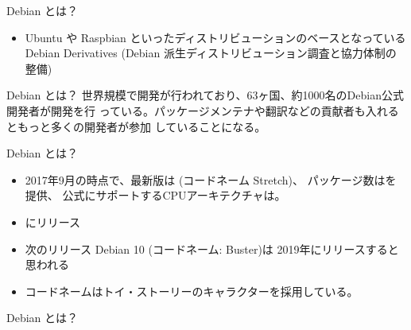 \begin{frame}{Debian とは？}

\begin{minipage}{0.45\hsize}
  \begin{itemize}
  \item Ubuntu や Raspbian といったディストリビューションのベースとなっている \\
	Debian Derivatives (Debian 派生ディストリビューション調査と協力体制の整備)
  \end{itemize}
\end{minipage} 
\begin{minipage}{0.45\hsize}
 \begin{center} 
 \end{center}
\end{minipage}

\end{frame}


\begin{frame}{Debian とは？}
 世界規模で開発が行われており、63ヶ国、約1000名のDebian公式開発者が開発を行
 っている。パッケージメンテナや翻訳などの貢献者も入れるともっと多くの開発者が参加
 していることになる。
 \begin{center}
 \end{center}
\end{frame}


\begin{frame}{Debian とは？}
\begin{itemize}[<+->]
 \item 2017年9月の時点で、\pause 最新版は {\color{red}{Debian 9.1}} (コードネーム Stretch)、\pause
 パッケージ数は{\color{red}{約51000}}を提供、\pause
 公式にサポートするCPUアーキテクチャは{\color{red}{10}}。\pause
 \item {\color{red}{約2年毎}}にリリース
 \item 次のリリース Debian 10 (コードネーム: {\color{red}{}}Buster)は 2019年にリリースすると思われる
 \item コードネームはトイ・ストーリーのキャラクターを採用している。
\end{itemize}
\end{frame}


\begin{frame}{Debian とは？}
  \begin{center}
  \end{center}
\end{frame}

